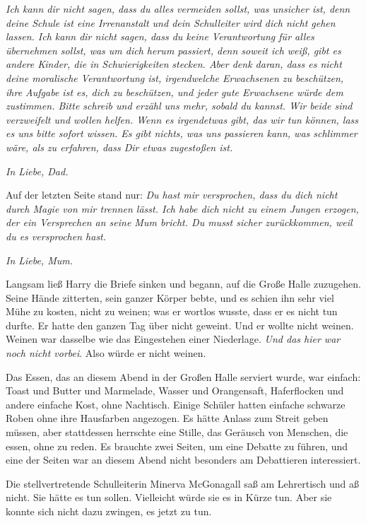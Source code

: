 \emph{Ich kann dir nicht sagen, dass du alles vermeiden sollst, was unsicher
ist, denn deine Schule ist eine Irrenanstalt und dein Schulleiter wird dich
nicht gehen lassen. Ich kann dir nicht sagen, dass du keine Verantwortung für
alles übernehmen sollst, was um dich herum passiert, denn soweit ich weiß, gibt
es andere Kinder, die in Schwierigkeiten} \emph{stecken. Aber denk daran, dass
es nicht deine moralische Verantwortung ist, irgendwelche Erwachsenen zu
beschützen, ihre Aufgabe ist es, dich zu beschützen, und jeder gute Erwachsene
würde dem zustimmen. Bitte schreib und erzähl uns mehr, sobald du kannst. Wir
beide sind verzweifelt und wollen helfen. Wenn es irgendetwas gibt, das wir tun
können, lass es uns bitte sofort wissen. Es gibt nichts, was uns passieren kann,
was schlimmer wäre, als zu erfahren, dass Dir etwas zugestoßen ist.}

\emph{In Liebe, Dad.}

Auf der letzten Seite stand nur: \emph{Du hast mir versprochen, dass du dich
nicht durch Magie von mir trennen lässt. Ich habe dich nicht zu einem Jungen
erzogen, der ein Versprechen an seine Mum bricht. Du musst sicher zurückkommen,
weil du es versprochen hast.}

\emph{In Liebe, Mum.}

Langsam ließ Harry die Briefe sinken und begann, auf die Große Halle zuzugehen.
Seine Hände zitterten, sein ganzer Körper bebte, und es schien ihn sehr viel
Mühe zu kosten, nicht zu weinen; was er wortlos wusste, dass er es nicht tun
durfte. Er hatte den ganzen Tag über nicht geweint. Und er wollte nicht weinen.
Weinen war dasselbe wie das Eingestehen einer Niederlage. \emph{Und das hier war
noch nicht vorbei}. Also würde er nicht weinen.

Das Essen, das an diesem Abend in der Großen Halle serviert wurde, war einfach:
Toast und Butter und Marmelade, Wasser und Orangensaft, Haferflocken und andere
einfache Kost, ohne Nachtisch. Einige Schüler hatten einfache schwarze Roben
ohne ihre Hausfarben angezogen. Es hätte Anlass zum Streit geben müssen, aber
stattdessen herrschte eine Stille, das Geräusch von Menschen, die essen, ohne zu
reden. Es brauchte zwei Seiten, um eine Debatte zu führen, und eine der Seiten
war an diesem Abend nicht besonders am Debattieren interessiert.

Die stellvertretende Schulleiterin Minerva McGonagall saß am Lehrertisch und aß
nicht. Sie hätte es tun sollen. Vielleicht würde sie es in Kürze tun. Aber sie
konnte sich nicht dazu zwingen, es jetzt zu tun.

